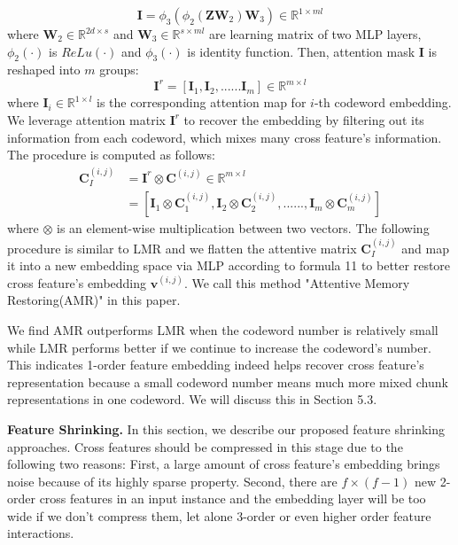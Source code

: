 \documentclass[sigconf,authorversion]{acmart}
\begin{document}
\begin{equation}
         \mathbf{I} = \phi_3\left(\phi_2\left(\mathbf{Z}\mathbf{W}_{2}\right )\mathbf{W}_{3}\right)\in \mathbb{R}^{1\times ml}
 \end{equation}
 where  $\mathbf{W}_2 \in \mathbb{R}^{ 2d\times s} $ and $\mathbf{W}_3 \in \mathbb{R}^{ s\times ml } $ are 
learning matrix of two MLP layers, $\phi_2\left(\cdot\right) $ is $ReLu \left(\cdot\right)$ and $\phi_3\left(\cdot\right) $ is identity function. Then, attention mask $\mathbf{I} $ is reshaped into $m $ groups:
  \begin{equation}
         \mathbf{I}^r = [\mathbf{I}_1,\mathbf{I}_2,......\mathbf{I}_m]\in \mathbb{R}^{m \times l}
 \end{equation}
where $\mathbf{I}_i \in \mathbb{R}^{1 \times l}$ is the corresponding attention map for $i $-th codeword embedding. We leverage attention matrix $ \mathbf{I}^r$ to recover the embedding by filtering out its information from each codeword, which mixes many cross feature's information. The procedure is computed as follows:
  \begin{equation}
  \begin{aligned} 
         \mathbf{C}_I^{(i,j)} & =\mathbf{I}^r \otimes \mathbf{C}^{(i,j)} \in \mathbb{R}^{m \times l}
         \\ &= [\mathbf{I}_1\otimes \mathbf{C}_1^{(i,j)},\mathbf{I}_2\otimes \mathbf{C}_2^{(i,j)},......,\mathbf{I}_m\otimes \mathbf{C}_m^{(i,j)}]
\end{aligned} 
 \end{equation}
 where  $\otimes$ is an element-wise multiplication between two vectors. The following procedure is similar to LMR and we flatten the attentive matrix $\mathbf{C}_I^{(i,j)}$ and map it into a new embedding space via MLP according to formula 11 to better restore cross feature's embedding $\mathbf{v}^{(i,j)}$. We call this method "Attentive Memory Restoring(AMR)" in this paper.

 We find AMR outperforms LMR when the codeword number is relatively small while LMR performs better if we continue to increase the codeword's number. This indicates 1-order feature embedding indeed helps recover cross feature's representation because a small codeword number means much more mixed chunk representations in one codeword. We will discuss this in Section 5.3.
 
\textbf{Feature Shrinking.}
In this section, we describe our proposed feature shrinking approaches. Cross features should be compressed in this stage due to the following two reasons: First, a large amount of cross feature's embedding brings noise because of its highly sparse property. Second, there are $f \times (f-1)$ new 2-order cross features in an input instance and the embedding layer will be too wide if we don't compress them, let alone 3-order or even higher order feature interactions.
\end{document}

